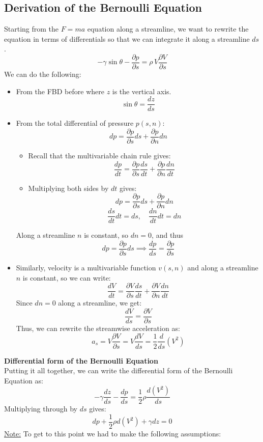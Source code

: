 ﻿\documentclass[12pt]{article}
\begin{document}
\subsection*{Derivation of the Bernoulli Equation}
Starting from the $F=ma$ equation along a streamline, we want to rewrite the equation in terms of differentials so that we can integrate it along a streamline $ds$.
\[-\gamma \sin\theta - \frac{\partial p}{\partial s}= \rho \, V \frac{\partial V}{\partial s}\]
We can do the following:
\begin{itemize}
    \item From the FBD before where $z$ is the vertical axis.
    \[\sin\theta = \frac{dz}{ds}\]
    \item From the total differential of pressure $p(s,n)$:
    \[dp = \frac{\partial p}{\partial s}ds + \frac{\partial p}{\partial n}dn\]
    \begin{itemize}
        \item Recall that the multivariable chain rule gives:
        \[\frac{dp}{dt} = \frac{\partial p}{\partial s}\frac{ds}{dt} + \frac{\partial p}{\partial n}\frac{dn}{dt}\]
        \item Multiplying both sides by $dt$ gives:
        \[dp = \frac{\partial p}{\partial s}ds + \frac{\partial p}{\partial n}dn\]
        \[\frac{ds}{dt} dt = ds,\quad \frac{dn}{dt} dt = dn\]
    \end{itemize}
    Along a streamline $n$ is constant, so $dn = 0$, and thus
    \[dp = \frac{\partial p}{\partial s}ds \implies \frac{dp}{ds} = \frac{\partial p}{\partial s}\]
        \item Similarly, velocity is a multivariable function $v(s,n)$ and along a streamline $n$ is constant, so we can write:
        \[\frac{dV}{dt} = \frac{\partial V}{\partial s}\frac{ds}{dt} + \frac{\partial V}{\partial n}\frac{dn}{dt}\]
        Since $dn = 0$ along a streamline, we get:
        \[\frac{dV}{ds} = \frac{\partial V}{\partial s}\]
        Thus, we can rewrite the streamwise acceleration as:
    \[a_s = V\frac{\partial V}{\partial s} = V\frac{dV}{ds}=\frac{1}{2}\frac{d}{ds}(V^2)\]
\end{itemize}
\textbf{Differential form of the Bernoulli Equation}\\
Putting it all together, we can write the differential form of the Bernoulli Equation as:
\[-\gamma \frac{dz}{ds} - \frac{dp}{ds} = \frac{1}{2}\rho \frac{d(V^2)}{ds}\]
Multiplying through by $ds$ gives:
\[\boxed{dp + \frac{1}{2}\rho d(V^2) + \gamma dz = 0}\]
\underline{Note:} To get to this point we had to make the following assumptions:
\end{document}
